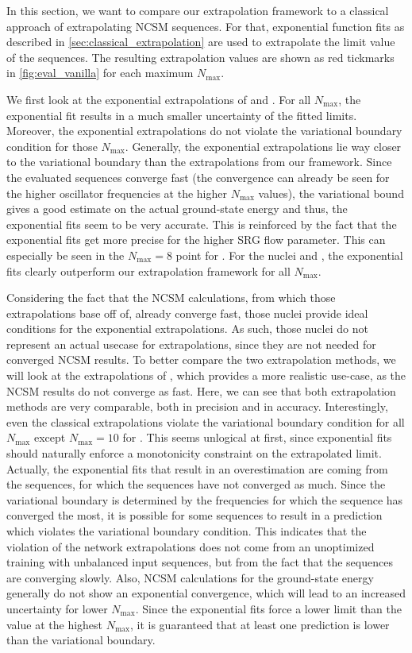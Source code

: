 In this section, we want to compare our extrapolation framework to a classical approach of extrapolating NCSM sequences. For that, exponential function fits as described in \autoref{sec:classical_extrapolation} are used to extrapolate the limit value of the sequences. The resulting extrapolation values are shown as red tickmarks in \autoref{fig:eval_vanilla} for each maximum $N_\mathrm{max}$.

We first look at the exponential extrapolations of  and . For all $N_\mathrm{max}$, the exponential fit results in a much smaller uncertainty of the fitted limits. Moreover, the exponential extrapolations do not violate the variational boundary condition for those $N_\mathrm{max}$. Generally, the exponential extrapolations lie way closer to the variational boundary than the extrapolations from our framework. Since the evaluated sequences converge fast (the convergence can already be seen for the higher oscillator frequencies at the higher $N_\mathrm{max}$ values), the variational bound gives a good estimate on the actual ground-state energy and thus, the exponential fits seem to be very accurate. This is reinforced by the fact that the exponential fits get more precise for the higher SRG flow parameter. This can especially be seen in the $N_\mathrm{max}=8$ point for . For the nuclei  and , the exponential fits clearly outperform our extrapolation framework for all $N_\mathrm{max}$.

Considering the fact that the NCSM calculations, from which those extrapolations base off of, already converge fast, those nuclei provide ideal conditions for the exponential extrapolations. As such, those nuclei do not represent an actual usecase for extrapolations, since they are not needed for converged NCSM results. To better compare the two extrapolation methods, we will look at the extrapolations of , which provides a more realistic use-case, as the NCSM results do not converge as fast. Here, we can see that both extrapolation methods are very comparable, both in precision and in accuracy. Interestingly, even the classical extrapolations violate the variational boundary condition for all $N_\mathrm{max}$ except $N_\mathrm{max} = 10$ for . This seems unlogical at first, since exponential fits should naturally enforce a monotonicity constraint on the extrapolated limit. Actually, the exponential fits that result in an overestimation are coming from the sequences, for which the sequences have not converged as much. Since the variational boundary is determined by the frequencies for which the sequence has converged the most, it is possible for some sequences to result in a prediction which violates the variational boundary condition. This indicates that the violation of the network extrapolations does not come from an unoptimized training with unbalanced input sequences, but from the fact that the sequences are converging slowly. Also, NCSM calculations for the ground-state energy generally do not show an exponential convergence, which will lead to an increased uncertainty for lower $N_\mathrm{max}$. Since the exponential fits force a lower limit than the value at the highest $N_\mathrm{max}$, it is guaranteed that at least one prediction is lower than the variational boundary.


